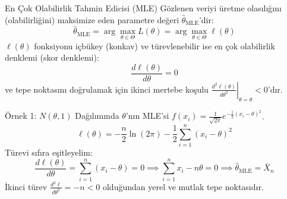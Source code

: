 \documentclass[12pt,a4paper]{article}
\begin{document}
\begin{tanim}{En Çok Olabilirlik Tahmin Edicisi (MLE)}
Gözlenen veriyi üretme olasılığını (olabilirliğini) maksimize eden parametre değeri $\hat{\theta}_{\text{MLE}}$'dir:
\begin{equation}
    \hat{\theta}_{\text{MLE}} = \arg\max_{\theta \in \Theta} L(\theta) = \arg\max_{\theta \in \Theta} \ell(\theta)
\end{equation}
$\ell(\theta)$ fonksiyonu içbükey (konkav) ve türevlenebilir ise en çok olabilirlik denklemi (skor denklemi):
\begin{equation}
    \frac{d\ell(\theta)}{d\theta} = 0
\end{equation}
ve tepe noktasını doğrulamak için ikinci mertebe koşulu $\left. \frac{d^2\ell(\theta)}{d\theta^2} \right|_{\theta = \hat{\theta}} < 0$'dır.
\end{tanim}

\begin{center}
\end{center}

\begin{ornek}{Örnek 1: $N(\theta, 1)$ Dağılımında $\theta$'nın MLE'si}
$f(x_i) = \frac{1}{\sqrt{2\pi}} e^{-\frac{1}{2}(x_i - \theta)^2}$.
\begin{equation}
    \ell(\theta) = -\frac{n}{2} \ln(2\pi) - \frac{1}{2} \sum_{i=1}^n (x_i - \theta)^2
\end{equation}
Türevi sıfıra eşitleyelim:
\begin{equation}
    \frac{d\ell(\theta)}{d\theta} = \sum_{i=1}^n (x_i - \theta) = 0 \implies \sum_{i=1}^n x_i - n\theta = 0 \implies \boxed{\hat{\theta}_{\text{MLE}} = \bar{X}_n}
\end{equation}
İkinci türev $\frac{d^2\ell}{d\theta^2} = -n < 0$ olduğundan yerel ve mutlak tepe noktasıdır.
\end{ornek}
\end{document}
